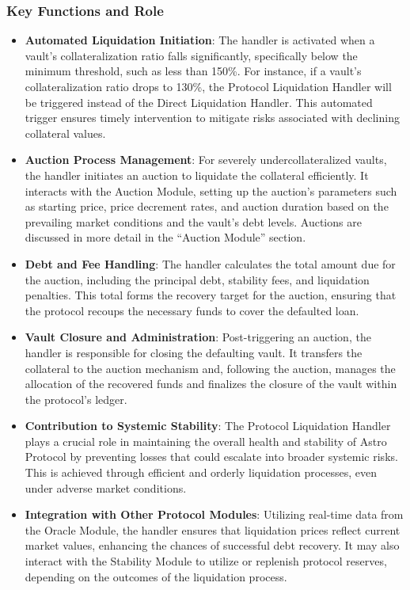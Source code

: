 \subsubsection{Key Functions and Role}
\begin{itemize}
    \item \textbf{Automated Liquidation Initiation}: The handler is activated when a vault’s collateralization ratio falls significantly, specifically below the minimum threshold, such as less than 150\%. For instance, if a vault's collateralization ratio drops to 130\%, the Protocol Liquidation Handler will be triggered instead of the Direct Liquidation Handler. This automated trigger ensures timely intervention to mitigate risks associated with declining collateral values.
    \item \textbf{Auction Process Management}: For severely undercollateralized vaults, the handler initiates an auction to liquidate the collateral efficiently. It interacts with the Auction Module, setting up the auction’s parameters such as starting price, price decrement rates, and auction duration based on the prevailing market conditions and the vault’s debt levels. Auctions are discussed in more detail in the “Auction Module” section.
    
    \item \textbf{Debt and Fee Handling}: The handler calculates the total amount due for the auction, including the principal debt, stability fees, and liquidation penalties. This total forms the recovery target for the auction, ensuring that the protocol recoups the necessary funds to cover the defaulted loan.
    \item \textbf{Vault Closure and Administration}: Post-triggering an auction, the handler is responsible for closing the defaulting vault. It transfers the collateral to the auction mechanism and, following the auction, manages the allocation of the recovered funds and finalizes the closure of the vault within the protocol’s ledger.
    \item \textbf{Contribution to Systemic Stability}: The Protocol Liquidation Handler plays a crucial role in maintaining the overall health and stability of Astro Protocol by preventing losses that could escalate into broader systemic risks. This is achieved through efficient and orderly liquidation processes, even under adverse market conditions.
    \item \textbf{Integration with Other Protocol Modules}: Utilizing real-time data from the Oracle Module, the handler ensures that liquidation prices reflect current market values, enhancing the chances of successful debt recovery. It may also interact with the Stability Module to utilize or replenish protocol reserves, depending on the outcomes of the liquidation process.
\end{itemize}

